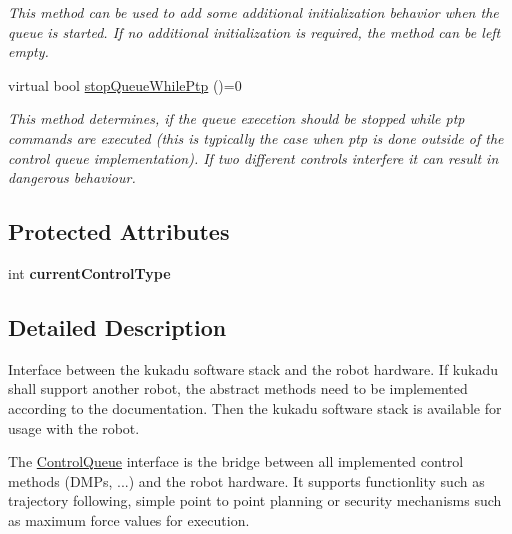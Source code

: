\begin{DoxyCompactItemize}
\begin{DoxyCompactList}\small\item\em This method can be used to add some additional initialization behavior when the queue is started. If no additional initialization is required, the method can be left empty. \end{DoxyCompactList}\item 
virtual bool \hyperlink{classkukadu_1_1ControlQueue_a6ebb66d1bd2188e1fca3ee1440b8c0fe}{stop\-Queue\-While\-Ptp} ()=0
\begin{DoxyCompactList}\small\item\em This method determines, if the queue execetion should be stopped while ptp commands are executed (this is typically the case when ptp is done outside of the control queue implementation). If two different controls interfere it can result in dangerous behaviour. \end{DoxyCompactList}\end{DoxyCompactItemize}
\subsection*{Protected Attributes}
\begin{DoxyCompactItemize}
\item 
\hypertarget{classkukadu_1_1ControlQueue_aadba228efd6e34095ce7d52bc94a4d29}{int {\bfseries current\-Control\-Type}}\label{classkukadu_1_1ControlQueue_aadba228efd6e34095ce7d52bc94a4d29}

\end{DoxyCompactItemize}


\subsection{Detailed Description}
Interface between the kukadu software stack and the robot hardware. If kukadu shall support another robot, the abstract methods need to be implemented according to the documentation. Then the kukadu software stack is available for usage with the robot. 

The \hyperlink{classkukadu_1_1ControlQueue}{Control\-Queue} interface is the bridge between all implemented control methods (D\-M\-Ps, ...) and the robot hardware. It supports functionlity such as trajectory following, simple point to point planning or security mechanisms such as maximum force values for execution. 


